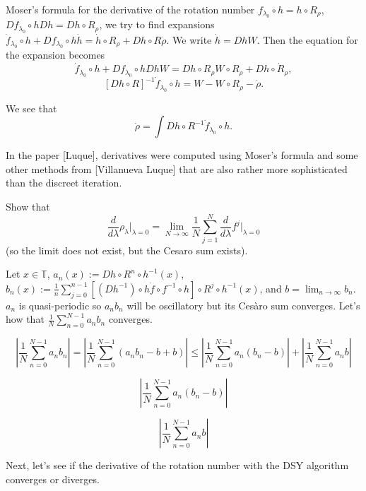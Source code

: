 \documentclass{article}
\begin{document}
Moser's formula for the derivative of the rotation number $f_{\lambda_0}\circ h=h\circ R_\rho$, $Df_{\lambda_0}\circ h Dh = Dh\circ R_\rho$, we try to find expansions $\Dot{f}_{\lambda_0}\circ h+Df_{\lambda_0}\circ h\Dot{h}=\Dot{h}\circ R_\rho+Dh\circ R\Dot{\rho}.$ We write $\Dot{h}=Dh
W$. Then the equation for the expansion becomes $$\Dot{f}_{\lambda_0}\circ h+Df_{\lambda_0}\circ hDhW = Dh \circ R_\rho W \circ R_\rho + Dh \circ \Dot{R}_\rho,$$
$$[Dh\circ R]^{-1}\Dot{f}_{\lambda_0}\circ h = W-W\circ R_\rho-\Dot{\rho}.$$

We see that $$\Dot{\rho}=\int Dh\circ R^{-1}\Dot{f}_{\lambda_0}\circ h.$$

In the paper [Luque], derivatives were computed using Moser's formula and some other methods from [Villanueva Luque] that are also rather more sophisticated than the discreet iteration. 

Show that $$\frac{d}{d\lambda}\rho_\lambda\bigg|_{\lambda=0}=\lim_{N\rightarrow\infty}\frac{1}{N}\sum_{j=1}^N\frac{d}{d\lambda}f^j\bigg|_{\lambda=0}$$ (so the limit does not exist, but the Cesaro sum exists). 

Let $x\in\mathbb{T}$, $a_n(x):=Dh\circ R^n\circ h^{-1}(x)$, $b_n(x):=\frac{1}{n}\sum_{j=0}^{n-1}\left[(Dh^{-1})\circ h \dot{f}\circ f^{-1}\circ h\right]\circ R^j\circ h^{-1}(x)$, and $b=\lim_{n\rightarrow\infty}b_n$. $a_n$ is quasi-periodic so $a_nb_n$ will be oscillatory but its Ces\`aro sum converges. Let's how that $\frac{1}{N}\sum_{n=0}^{N-1}a_nb_n$ converges.

\[\left|\frac{1}{N}\sum_{n=0}^{N-1}a_nb_n\right|
    = \left|\frac{1}{N}\sum_{n=0}^{N-1}(a_nb_n-b+b)\right|
    \leq \left|\frac{1}{N}\sum_{n=0}^{N-1}a_n(b_n-b)\right| + \left|\frac{1}{N}\sum_{n=0}^{N-1}a_nb\right|\]

\[\left|\frac{1}{N}\sum_{n=0}^{N-1}a_n(b_n-b)\right|  \]

\[\left|\frac{1}{N}\sum_{n=0}^{N-1}a_nb\right|\]

Next, let's see if the derivative of the rotation number with the DSY algorithm converges or diverges.
\end{document}
